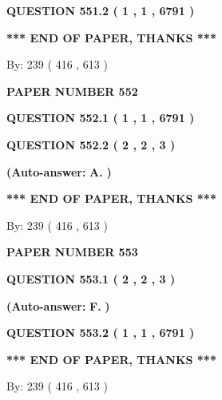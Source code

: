 \documentclass[12pt]{article}
\begin{document}
 
  
  
{\textbf{\large{QUESTION
551.2 
 ( 1 , 1 , 6791 )
}}}
   
   
   
   
\vspace{1.0in} 
{\textbf{\large{ *** END OF PAPER, THANKS *** }}} 
   
   
\hspace{1.0in} By: 
 239 ( 416 ,  613 )
   
   
   
   
\newpage 
\setcounter{page}{ 
   552001 } 
   
   
 {\textbf{ \Large{ PAPER NUMBER  552  }}}
   
   
   
   
  
  
{\textbf{\large{QUESTION
552.1 
 ( 1 , 1 , 6791 )
}}}
  
  
{\textbf{\large{QUESTION
552.2 
 ( 2 , 2 , 3 )
}}}
 
 
{\textbf{(Auto-answer:}}
{\textbf{\large{
A.}}}
{\textbf{)}}
 
 
   
   
   
   
\vspace{1.0in} 
{\textbf{\large{ *** END OF PAPER, THANKS *** }}} 
   
   
\hspace{1.0in} By: 
 239 ( 416 ,  613 )
   
   
   
   
\newpage 
\setcounter{page}{ 
   553001 } 
   
   
 {\textbf{ \Large{ PAPER NUMBER  553  }}}
   
   
   
   
  
  
{\textbf{\large{QUESTION
553.1 
 ( 2 , 2 , 3 )
}}}
 
 
{\textbf{(Auto-answer:}}
{\textbf{\large{
F.}}}
{\textbf{)}}
 
 
  
  
{\textbf{\large{QUESTION
553.2 
 ( 1 , 1 , 6791 )
}}}
   
   
   
   
\vspace{1.0in} 
{\textbf{\large{ *** END OF PAPER, THANKS *** }}} 
   
   
\hspace{1.0in} By: 
 239 ( 416 ,  613 )
   
   
   
   
\newpage 
\setcounter{page}{ 
   554001 } 
   
\end{document}
